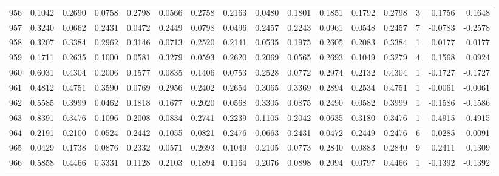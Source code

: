\begin{tabular}{lrrrrrrrrrrrrrrr}
956 &      0.1042 &  0.2690 &  0.0758 &  0.2798 &  0.0566 &  0.2758 &  0.2163 &  0.0480 &  0.1801 &  0.1851 &   0.1792 &     0.2798 &      3 &                    0.1756 &                     0.1648 \\
957 &      0.3240 &  0.0662 &  0.2431 &  0.0472 &  0.2449 &  0.0798 &  0.0496 &  0.2457 &  0.2243 &  0.0961 &   0.0548 &     0.2457 &      7 &                   -0.0783 &                    -0.2578 \\
958 &      0.3207 &  0.3384 &  0.2962 &  0.3146 &  0.0713 &  0.2520 &  0.2141 &  0.0535 &  0.1975 &  0.2605 &   0.2083 &     0.3384 &      1 &                    0.0177 &                     0.0177 \\
959 &      0.1711 &  0.2635 &  0.1000 &  0.0581 &  0.3279 &  0.0593 &  0.2620 &  0.2069 &  0.0565 &  0.2693 &   0.1049 &     0.3279 &      4 &                    0.1568 &                     0.0924 \\
960 &      0.6031 &  0.4304 &  0.2006 &  0.1577 &  0.0835 &  0.1406 &  0.0753 &  0.2528 &  0.0772 &  0.2974 &   0.2132 &     0.4304 &      1 &                   -0.1727 &                    -0.1727 \\
961 &      0.4812 &  0.4751 &  0.3590 &  0.0769 &  0.2956 &  0.2402 &  0.2654 &  0.3065 &  0.3369 &  0.2894 &   0.2534 &     0.4751 &      1 &                   -0.0061 &                    -0.0061 \\
962 &      0.5585 &  0.3999 &  0.0462 &  0.1818 &  0.1677 &  0.2020 &  0.0568 &  0.3305 &  0.0875 &  0.2490 &   0.0582 &     0.3999 &      1 &                   -0.1586 &                    -0.1586 \\
963 &      0.8391 &  0.3476 &  0.1096 &  0.2008 &  0.0834 &  0.2741 &  0.2239 &  0.1105 &  0.2042 &  0.0635 &   0.3180 &     0.3476 &      1 &                   -0.4915 &                    -0.4915 \\
964 &      0.2191 &  0.2100 &  0.0524 &  0.2442 &  0.1055 &  0.0821 &  0.2476 &  0.0663 &  0.2431 &  0.0472 &   0.2449 &     0.2476 &      6 &                    0.0285 &                    -0.0091 \\
965 &      0.0429 &  0.1738 &  0.0876 &  0.2332 &  0.0571 &  0.2693 &  0.1049 &  0.2105 &  0.0773 &  0.2840 &   0.0883 &     0.2840 &      9 &                    0.2411 &                     0.1309 \\
966 &      0.5858 &  0.4466 &  0.3331 &  0.1128 &  0.2103 &  0.1894 &  0.1164 &  0.2076 &  0.0898 &  0.2094 &   0.0797 &     0.4466 &      1 &                   -0.1392 &                    -0.1392 \\

\end{tabular}
